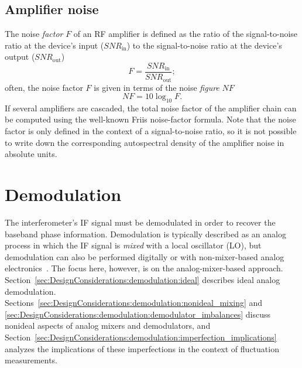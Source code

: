 \subsection{Amplifier noise}
The noise \emph{factor} $F$ of an RF amplifier is defined as the ratio of
the signal-to-noise ratio at the device's input ($SNR_{\text{in}}$) to
the signal-to-noise ratio at the device's output ($SNR_{\text{out}}$)
\begin{equation}
  F = \frac{SNR_{\text{in}}}{SNR_{\text{out}}};
\end{equation}
often, the noise factor $F$ is given
in terms of the noise \emph{figure} $NF$
\cite{minicircuits_amplifier_terms_defined}
\begin{equation}
  NF = 10 \log_{10} F.
\end{equation}
If several amplifiers are cascaded,
the total noise factor of the amplifier chain
can be computed using the well-known Friis noise-factor formula.
Note that the noise factor is only defined
in the context of a signal-to-noise ratio, so
it is not possible to write down the corresponding
autospectral density of the amplifier noise in absolute units.


\section{Demodulation}
\label{sec:DesignConsiderations:demodulation}
The interferometer's IF signal must be demodulated
in order to recover the baseband phase information.
Demodulation is typically described as an analog process
in which the IF signal is \emph{mixed} with a local oscillator (LO), but
demodulation can also be performed digitally
\cite{vanzeeland_rsi08, mlynek_fst12} or
with non-mixer-based analog electronics~\cite{mlynek_rsi17}.
The focus here, however, is on the analog-mixer-based approach.
Section~\ref{sec:DesignConsiderations:demodulation:ideal}
describes ideal analog demodulation.
Sections~\ref{sec:DesignConsiderations:demodulation:nonideal_mixing} and
\ref{sec:DesignConsiderations:demodulation:demodulator_imbalances}
discuss nonideal aspects of analog mixers and demodulators, and
Section~\ref{sec:DesignConsiderations:demodulation:imperfection_implications}
analyzes the implications of these imperfections
in the context of fluctuation measurements.



